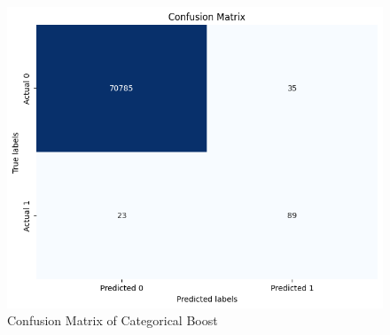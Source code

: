 \begin{figure}[ht]
    \centering
    \includegraphics[scale=0.6]{figures/CM_CatBoost.png}
    \caption{Confusion Matrix of Categorical Boost}
    \label{fig:Plot of the Data}
\end{figure}

\clearpage




